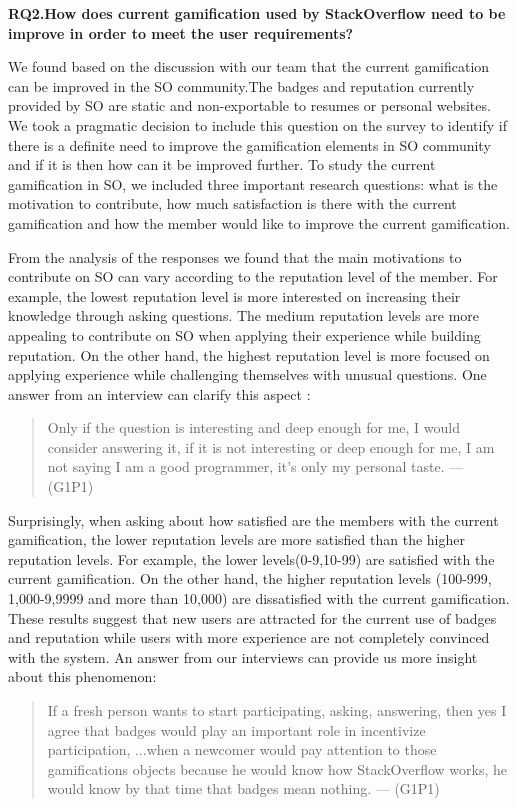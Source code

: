 \documentclass{sigchi}
\begin{document}
\textbf{RQ2.How does current gamification used by StackOverflow need to be improve in order to meet the user requirements?}

We found based on the discussion with our team that the current gamification can be improved in the SO community.The badges and reputation currently provided by SO are static and non-exportable to resumes or personal websites. We took a pragmatic decision to include this question on the survey to identify if there is a definite need to improve the gamification elements in SO community and if it is then how can it be improved further. To study the current gamification in SO, we included three important research questions: what is the motivation to contribute, how much satisfaction is there with the current gamification and how the member would like to improve the current gamification.

From the analysis of the responses we found that the main motivations to contribute on SO can vary according to the reputation level of the member. For example, the lowest reputation level is more interested on increasing their knowledge through asking questions. The medium reputation levels are more appealing to contribute on SO when applying their experience while building reputation. On the other hand, the highest reputation level is more focused on applying experience while challenging themselves with unusual questions. One answer from an interview can clarify this aspect :

\begin{quote}
Only if the question is interesting and deep enough for me, I would consider answering it, if it is not interesting or deep enough for me, I am not saying I am a good programmer, it’s only my personal taste. --- (G1P1)
\end{quote}

Surprisingly, when asking about how satisfied are the members with the current gamification, the lower reputation levels are more satisfied than the higher reputation levels. For example, the lower levels(0-9,10-99) are satisfied with the current gamification. On the other hand, the higher  reputation levels (100-999, 1,000-9,9999 and more than 10,000) are dissatisfied with the current gamification. These results suggest that new users are attracted for the current use of badges and reputation while users with more experience are not completely convinced with the system. An answer from our interviews can provide us more insight about this phenomenon:

\begin{quote}
If a fresh person wants to start participating, asking, answering, then yes I agree that badges would play an important role in incentivize participation, ...when a newcomer would pay attention to those gamifications objects because he would know how StackOverflow works, he would know by that time that badges mean nothing. --- (G1P1)
\end{quote}
\end{document}
